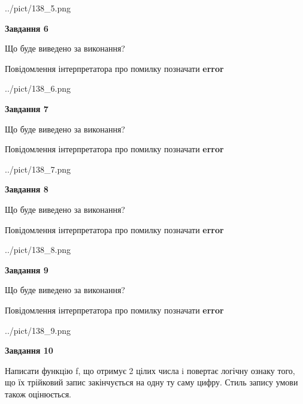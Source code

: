 \documentclass[12pt, ukrainian]{article}
\begin{document}
{\begin {large}
\begin{center}
	{../pict/138_5.png}
\end{center}
\newpage

{\begin {center}\textbf{Завдання 6}\end {center}}\par
Що буде виведено за виконання? \par
Повідомлення інтерпретатора про помилку позначати \textbf{error}

\begin{center}
	{../pict/138_6.png}
\end{center}
\newpage

{\begin {center}\textbf{Завдання 7}\end {center}}\par
Що буде виведено за виконання? \par
Повідомлення інтерпретатора про помилку позначати \textbf{error}

\begin{center}
	{../pict/138_7.png}
\end{center}
\newpage

{\begin {center}\textbf{Завдання 8}\end {center}}\par
Що буде виведено за виконання? \par
Повідомлення інтерпретатора про помилку позначати \textbf{error}

\begin{center}
	{../pict/138_8.png}
\end{center}
\newpage

{\begin {center}\textbf{Завдання 9}\end {center}}\par
Що буде виведено за виконання? \par
Повідомлення інтерпретатора про помилку позначати \textbf{error}

\begin{center}
	{../pict/138_9.png}
\end{center}
\newpage

{\begin {center}\textbf{Завдання 10}\end {center}}\par

Написати функцiю f, що отримує 2 цілих числа i повертає логічну ознаку того, що їх трійковий запис закінчується на одну ту саму цифру. Стиль запису умови також оцінюється.\par
\newpage

\end {large}}
\end{document}
